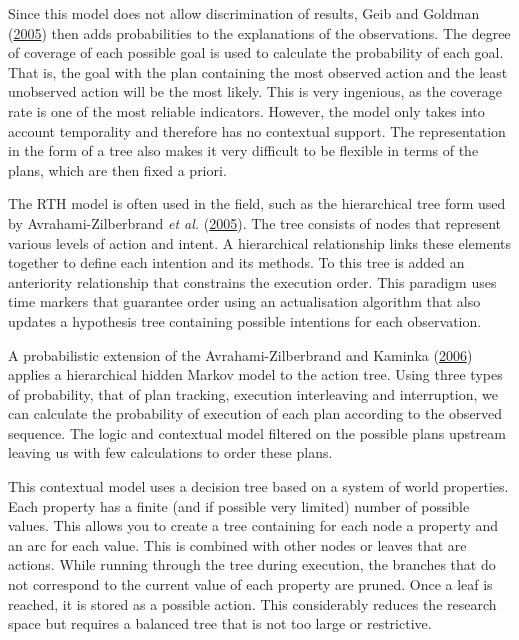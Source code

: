 \documentclass[11pt,a4paper,twoside,openright,titlepage,numbers=noenddot,headinclude,cleardoublepage=empty,openany]{scrreprt}
\theoremstyle{plain}
\theoremstyle{definition}
\theoremstyle{remark}
\begin{document}
Since this model does not allow discrimination of results, Geib and
Goldman (\protect\hyperlink{ref-geib_partial_2005}{2005}) then adds
probabilities to the explanations of the observations. The degree of
coverage of each possible goal is used to calculate the probability of
each goal. That is, the goal with the plan containing the most observed
action and the least unobserved action will be the most likely. This is
very ingenious, as the coverage rate is one of the most reliable
indicators. However, the model only takes into account temporality and
therefore has no contextual support. The representation in the form of a
tree also makes it very difficult to be flexible in terms of the plans,
which are then fixed a priori.

The RTH model is often used in the field, such as the hierarchical tree
form used by Avrahami-Zilberbrand \emph{et al.}
(\protect\hyperlink{ref-avrahami-zilberbrand_fast_2005b}{2005}). The
tree consists of nodes that represent various levels of action and
intent. A hierarchical relationship links these elements together to
define each intention and its methods. To this tree is added an
anteriority relationship that constrains the execution order. This
paradigm uses time markers that guarantee order using an actualisation
algorithm that also updates a hypothesis tree containing possible
intentions for each observation.

A probabilistic extension of the Avrahami-Zilberbrand and Kaminka
(\protect\hyperlink{ref-avrahami-zilberbrand_hybrid_2006}{2006}) applies
a hierarchical hidden Markov model to the action tree. Using three types
of probability, that of plan tracking, execution interleaving and
interruption, we can calculate the probability of execution of each plan
according to the observed sequence. The logic and contextual model
filtered on the possible plans upstream leaving us with few calculations
to order these plans.

This contextual model uses a decision tree based on a system of world
properties. Each property has a finite (and if possible very limited)
number of possible values. This allows you to create a tree containing
for each node a property and an arc for each value. This is combined
with other nodes or leaves that are actions. While running through the
tree during execution, the branches that do not correspond to the
current value of each property are pruned. Once a leaf is reached, it is
stored as a possible action. This considerably reduces the research
space but requires a balanced tree that is not too large or restrictive.
\end{document}
